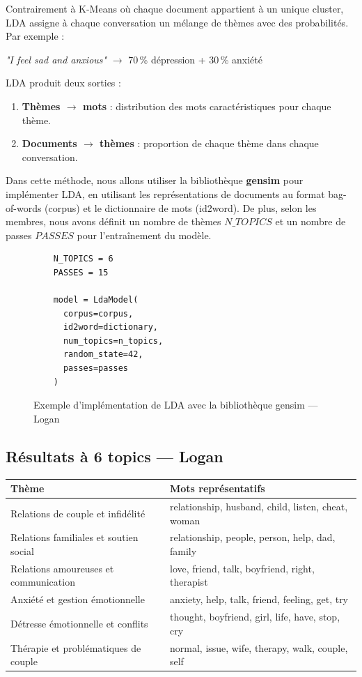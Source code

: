 \documentclass[12pt,a4paper]{report}
\begin{document}
Contrairement à K-Means où chaque document appartient à un unique cluster, LDA assigne à
chaque conversation un mélange de thèmes avec des probabilités. Par exemple :

\begin{center}
\textit{"I feel sad and anxious"} $\longrightarrow$ 70\,\% dépression + 30\,\% anxiété
\end{center}

LDA produit deux sorties :
\begin{enumerate}
  \item \textbf{Thèmes $\to$ mots} : distribution des mots caractéristiques pour chaque thème.
  \item \textbf{Documents $\to$ thèmes} : proportion de chaque thème dans chaque conversation.
\end{enumerate}

\bigskip

Dans cette méthode, nous allons utiliser la bibliothèque \textbf{gensim} pour implémenter LDA, en utilisant les représentations de documents au format bag-of-words (corpus) et le dictionnaire de mots (id2word).
De plus, selon les membres, nous avons définit un nombre de thèmes $N\_TOPICS$ et un nombre de passes $PASSES$ pour l'entraînement du modèle.
\begin{figure}[ht]
  \begin{lstlisting}
    N_TOPICS = 6
    PASSES = 15
    
    model = LdaModel(
      corpus=corpus, 
      id2word=dictionary, 
      num_topics=n_topics, 
      random_state=42, 
      passes=passes
    )
  \end{lstlisting}
  \caption{Exemple d'implémentation de LDA avec la bibliothèque gensim — Logan}
\end{figure}

\pagebreak

\subsection{Résultats à 6 topics — Logan}

\begin{center}
\begin{tabular}{@{}ll@{}}
\toprule
\textbf{Thème} & \textbf{Mots représentatifs} \\
\midrule
Relations de couple et infidélité        & relationship, husband, child, listen, cheat, woman \\
Relations familiales et soutien social   & relationship, people, person, help, dad, family \\
Relations amoureuses et communication    & love, friend, talk, boyfriend, right, therapist \\
Anxiété et gestion émotionnelle          & anxiety, help, talk, friend, feeling, get, try \\
Détresse émotionnelle et conflits        & thought, boyfriend, girl, life, have, stop, cry \\
Thérapie et problématiques de couple     & normal, issue, wife, therapy, walk, couple, self \\
\bottomrule
\end{tabular}
\end{center}
\end{document}
